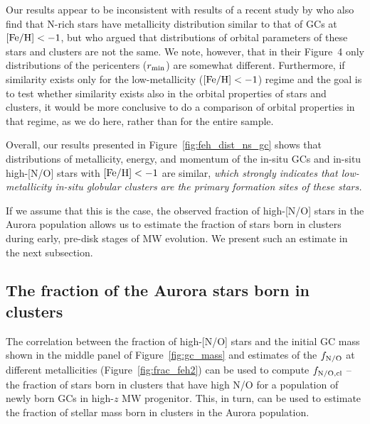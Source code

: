 \documentclass[a4paper,useAMS,usenatbib]{mnras}
\begin{document}
Our results appear to be inconsistent with results of a recent study by \citet{Kim.etal.2023} who also find that N-rich stars have metallicity distribution similar to that of GCs at $\rm [Fe/H]<-1$, but who argued that distributions of orbital parameters of these stars and clusters
are not the same. We note, however, that in their Figure~4 only distributions of the pericenters ($r_{\rm min}$) are somewhat different. 
Furthermore, if similarity exists only for the low-metallicity ($\rm [Fe/H]<-1$) regime and the goal is to test whether similarity exists also in the orbital properties of stars and clusters, it would be more conclusive to do a comparison of orbital
properties in that regime, as we do here, rather than for the entire sample. 


Overall, our results presented in Figure~\ref{fig:feh_dist_ns_gc} shows  that distributions of metallicity, energy, and momentum of the in-situ GCs and in-situ high-[N/O] stars with $\rm [Fe/H]<-1$ are similar, {\it which strongly indicates that low-metallicity in-situ globular clusters are the primary formation sites of these stars.} 

If we assume that this is the case, the observed fraction of high-[N/O] stars in the Aurora population allows us to estimate the fraction of stars born in clusters during early, pre-disk stages of  MW evolution. We present such an estimate in the next subsection.  




\subsection{The fraction of the Aurora stars born in clusters}
\label{sec:fcl}

The correlation between the fraction of high-[N/O] stars and the initial GC mass shown in the middle panel of Figure~\ref{fig:gc_mass} and estimates of the $f_{\rm N/O}$ at different metallicities (Figure~\ref{fig:frac_feh2}) can be used to compute  $f_{\rm N/O,cl}$ -- the fraction of stars born in clusters that have high N/O for a population of newly born GCs in high-$z$ MW progenitor. This, in turn, can be used to estimate the fraction of stellar mass born in clusters in the Aurora population.
\end{document}

